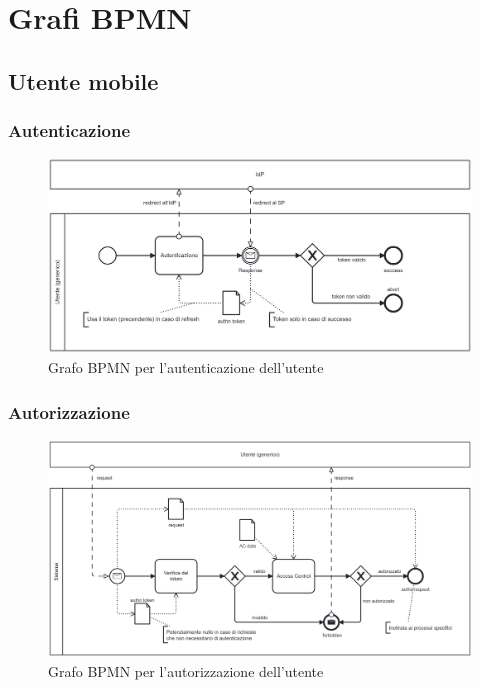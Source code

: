\documentclass{article}
\begin{document}
\clearpage

\section{Grafi BPMN}

\subsection{Utente mobile}

\subsubsection{Autenticazione}

\begin{figure}[htbp]
    \label{7.1.1}
    \centering
    \includegraphics[width=1\textwidth]{Images/BPMN - authn.png}
    \caption{Grafo BPMN per l'autenticazione dell'utente}
\end{figure}

\clearpage

\subsubsection{Autorizzazione}

\begin{figure}[htbp]
    \label{7.1.2}
    \centering
    \includegraphics[width=1\textwidth]{Images/BPMN - authz.png}
    \caption{Grafo BPMN per l'autorizzazione dell'utente}
\end{figure}
\end{document}
